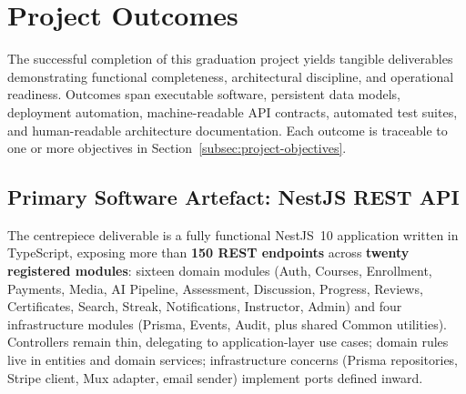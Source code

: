 
\section{Project Outcomes}
\label{sec:project-outcomes}

The successful completion of this graduation project yields tangible deliverables demonstrating functional completeness, architectural discipline, and operational readiness. Outcomes span executable software, persistent data models, deployment automation, machine-readable API contracts, automated test suites, and human-readable architecture documentation. Each outcome is traceable to one or more objectives in Section~\ref{subsec:project-objectives}.

\subsection{Primary Software Artefact: NestJS REST API}
\label{subsec:outcome-api}

The centrepiece deliverable is a fully functional NestJS~10 application written in TypeScript, exposing more than \textbf{150 REST endpoints} across \textbf{twenty registered modules}: sixteen domain modules (Auth, Courses, Enrollment, Payments, Media, AI Pipeline, Assessment, Discussion, Progress, Reviews, Certificates, Search, Streak, Notifications, Instructor, Admin) and four infrastructure modules (Prisma, Events, Audit, plus shared Common utilities). Controllers remain thin, delegating to application-layer use cases; domain rules live in entities and domain services; infrastructure concerns (Prisma repositories, Stripe client, Mux adapter, email sender) implement ports defined inward.

